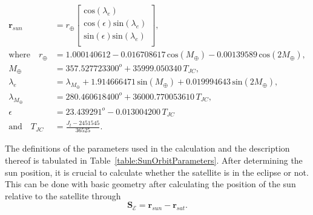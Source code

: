 \begin{equation}
\label{eq:sunPosition}
	\begin{aligned}
		\mathbf{r}_{sun} &= r_{\oplus} \begin{bmatrix}
		\text{cos}(\lambda_e) \\ \text{cos}(\epsilon)\text{sin}(\lambda_e) \\ \text{sin}(\epsilon)\text{sin}(\lambda_e) \\
		\end{bmatrix}, \\
		\text{where} \quad r_{\oplus} &= \num{1.000140612} - \num{0.016708617} \, \text{cos}(M_{\oplus}) - \num{0.00139589} \, \text{cos}(2M_{\oplus}), \\
		M_{\oplus} &= \num{357.527723300}^o + \num{35999.050340} \, T_{JC}, \\
		\lambda_e &= \lambda_{M_{\oplus}} + \num{1.914666471} \, \text{sin}(M_{\oplus}) + \num{0.019994643} \, \text{sin}(2M_{\oplus}), \\
		\lambda_{M_{\oplus}} &= \num{280.460618400}^o + \num{36000.770053610} \, T_{JC}, \\
		\epsilon &= \num{23.439291}^o - \num{0.013004200} \, T_{JC} \\
		\text{and} \quad T_{JC} &= \frac{J_t - \num{2451545}}{\num{36525}}.
	\end{aligned}
\end{equation}

The definitions of the parameters used in the calculation and the description thereof is tabulated in Table~\ref{table:SunOrbitParameters}. After determining the sun position, it is crucial to calculate whether the satellite is in the eclipse or not. This can be done with basic geometry after calculating the position of the sun relative to the satellite through
\begin{equation}
\mathbf{S}_{\mathcal{E}} = \mathbf{r}_{sun} - \mathbf{r}_{sat}.
\end{equation}


